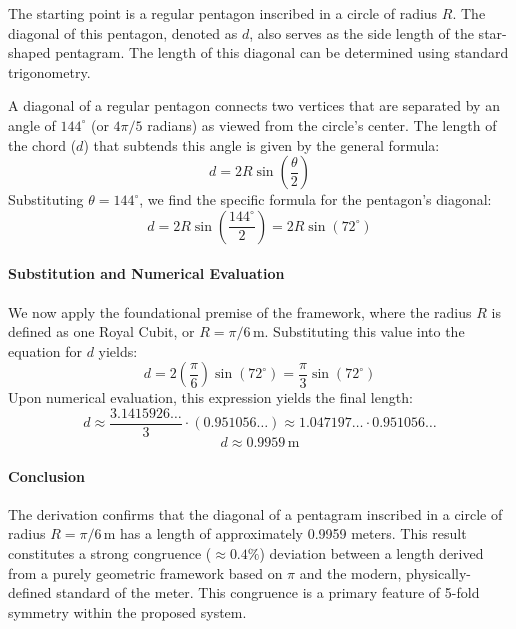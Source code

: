 \documentclass[11pt]{article}
\begin{document}
The starting point is a regular pentagon inscribed in a circle of radius $R$. The diagonal of this pentagon, denoted as $d$, also serves as the side length of the star-shaped pentagram. The length of this diagonal can be determined using standard trigonometry.

A diagonal of a regular pentagon connects two vertices that are separated by an angle of $144^\circ$ (or $4\pi/5$ radians) as viewed from the circle's center. The length of the chord ($d$) that subtends this angle is given by the general formula:
\[
d = 2R \sin\left(\frac{\theta}{2}\right)
\]
Substituting $\theta = 144^\circ$, we find the specific formula for the pentagon's diagonal:
\[
d = 2R \sin\left(\frac{144^\circ}{2}\right) = 2R \sin(72^\circ)
\]

\paragraph{Substitution and Numerical Evaluation}

We now apply the foundational premise of the framework, where the radius $R$ is defined as one Royal Cubit, or $R = \pi/6\,\text{m}$. Substituting this value into the equation for $d$ yields:
\[
d = 2 \left( \frac{\pi}{6} \right) \sin(72^\circ) = \frac{\pi}{3} \sin(72^\circ)
\]
Upon numerical evaluation, this expression yields the final length:
\[
d \approx \frac{3.1415926\dots}{3} \cdot (0.951056\dots) \approx 1.047197\dots \cdot 0.951056\dots
\]
\[
d \approx 0.9959\,\text{m}
\]

\paragraph{Conclusion}

The derivation confirms that the diagonal of a pentagram inscribed in a circle of radius $R = \pi/6\,\text{m}$ has a length of approximately 0.9959 meters. This result constitutes a strong congruence ($\approx0.4\%$) deviation between a length derived from a purely geometric framework based on $\pi$ and the modern, physically-defined standard of the meter. This congruence is a primary feature of 5-fold symmetry within the proposed system.
\end{document}
